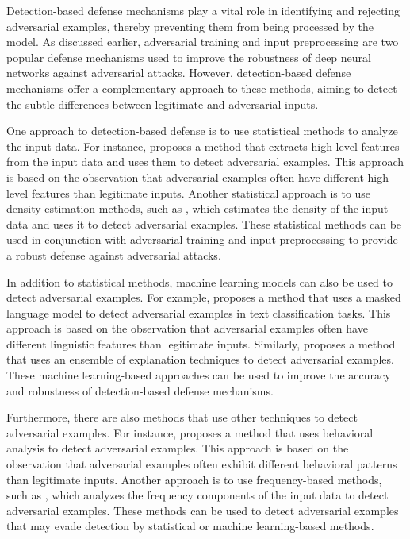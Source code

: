 \documentclass[11pt]{article}
\begin{document}
Detection-based defense mechanisms play a vital role in identifying and rejecting adversarial examples, thereby preventing them from being processed by the model. As discussed earlier, adversarial training and input preprocessing are two popular defense mechanisms used to improve the robustness of deep neural networks against adversarial attacks. However, detection-based defense mechanisms offer a complementary approach to these methods, aiming to detect the subtle differences between legitimate and adversarial inputs.

One approach to detection-based defense is to use statistical methods to analyze the input data. For instance, \cite{ref91} proposes a method that extracts high-level features from the input data and uses them to detect adversarial examples. This approach is based on the observation that adversarial examples often have different high-level features than legitimate inputs. Another statistical approach is to use density estimation methods, such as \cite{ref92}, which estimates the density of the input data and uses it to detect adversarial examples. These statistical methods can be used in conjunction with adversarial training and input preprocessing to provide a robust defense against adversarial attacks.

In addition to statistical methods, machine learning models can also be used to detect adversarial examples. For example, \cite{ref93} proposes a method that uses a masked language model to detect adversarial examples in text classification tasks. This approach is based on the observation that adversarial examples often have different linguistic features than legitimate inputs. Similarly, \cite{ref94} proposes a method that uses an ensemble of explanation techniques to detect adversarial examples. These machine learning-based approaches can be used to improve the accuracy and robustness of detection-based defense mechanisms.

Furthermore, there are also methods that use other techniques to detect adversarial examples. For instance, \cite{ref95} proposes a method that uses behavioral analysis to detect adversarial examples. This approach is based on the observation that adversarial examples often exhibit different behavioral patterns than legitimate inputs. Another approach is to use frequency-based methods, such as \cite{ref96}, which analyzes the frequency components of the input data to detect adversarial examples. These methods can be used to detect adversarial examples that may evade detection by statistical or machine learning-based methods.
\end{document}
